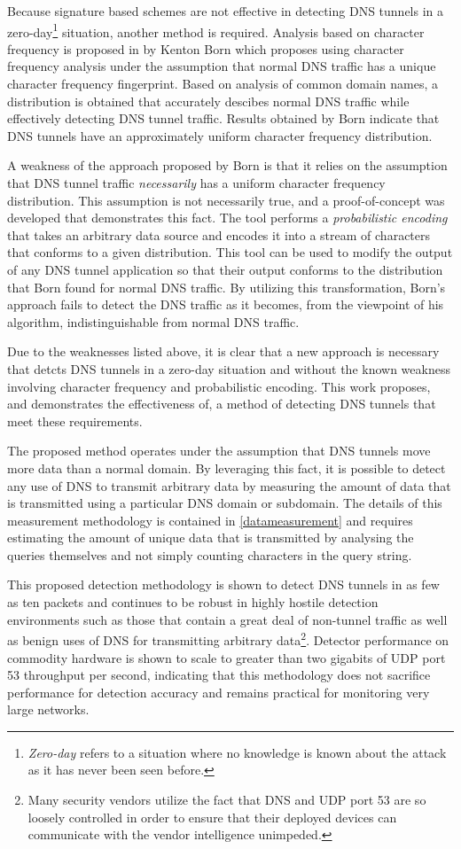 \documentclass{article}
\theoremstyle{remark}
\theoremstyle{definition}
\theoremstyle{definition}
\theoremstyle{definition}
\begin{document}
Because signature based schemes are not effective in detecting DNS tunnels in a
zero-day\footnote{\emph{Zero-day} refers to a situation where no knowledge is
known about the attack as it has never been seen before.} situation, another
method is required. Analysis based on character frequency is proposed
in\cite{kenton.born.frequency} by Kenton Born which proposes using character
frequency analysis under the assumption that normal DNS traffic has a unique
character frequency fingerprint. Based on analysis of common domain names, a
distribution is obtained that accurately descibes normal DNS traffic while
effectively detecting DNS tunnel traffic. Results obtained by Born indicate
that DNS tunnels have an approximately uniform character frequency distribution.

A weakness of the approach proposed by Born is that it relies on the assumption
that DNS tunnel traffic \emph{necessarily} has a uniform character frequency
distribution. This assumption is not necessarily true, and a proof-of-concept
was developed that demonstrates this fact. The tool performs a
\emph{probabilistic encoding} that takes an arbitrary data source and encodes
it into a stream of characters that conforms to a given distribution. This tool
can be used to modify the output of any DNS tunnel application so that their
output conforms to the distribution that Born found for normal DNS traffic. By
utilizing this transformation, Born's approach fails to detect the DNS traffic
as it becomes, from the viewpoint of his algorithm, indistinguishable from
normal DNS traffic.

Due to the weaknesses listed above, it is clear that a new approach is
necessary that detcts DNS tunnels in a zero-day situation and without the known
weakness involving character frequency and probabilistic encoding. This work
proposes, and demonstrates the effectiveness of, a method of detecting DNS
tunnels that meet these requirements.

The proposed method operates under the assumption that DNS tunnels move more
data than a normal domain. By leveraging this fact, it is possible to detect
any use of DNS to transmit arbitrary data by measuring the amount of data that
is transmitted using a particular DNS domain or subdomain. The details of this
measurement methodology is contained in \ref{datameasurement} and requires
estimating the amount of unique data that is transmitted by analysing the
queries themselves and not simply counting characters in the query string.

This proposed detection methodology is shown to detect DNS tunnels in as few as
ten packets and continues to be robust in highly hostile detection environments
such as those that contain a great deal of non-tunnel traffic as well as benign
uses of DNS for transmitting arbitrary data\footnote{Many security vendors
utilize the fact that DNS and UDP port 53 are so loosely controlled in order to
ensure that their deployed devices can communicate with the vendor intelligence
unimpeded.}. Detector performance on commodity hardware is shown to scale to
greater than two gigabits of UDP port 53 throughput per second, indicating that
this methodology does not sacrifice performance for detection accuracy and
remains practical for monitoring very large networks.
\end{document}
